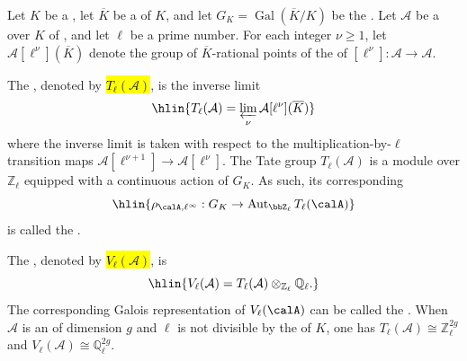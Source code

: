 \begin{definition} \label{definition:ell_adic_tate_group_of_a_commutative_group_scheme_over_a_field}
Let $K$ be a , let $\overline{K}$ be a  of $K$, and let $G_K = \operatorname{Gal}(\overline{K}/K)$ be the . Let $\mathcal{A}$ be a  over $K$ of , and let $\ell$ be a prime number. For each integer $\nu \geq 1$, let $\mathcal{A}[\ell^\nu](\overline{K})$ denote the group of $\overline{K}$-rational points of the  of $[\ell^\nu]: \mathcal{A} \to \mathcal{A}$. 

The , denoted by \hl{$T_\ell(\mathcal{A})$}, is the inverse limit
$$\hlin{T_\ell(\mathcal{A}) = \varprojlim_{\nu} \mathcal{A}[\ell^\nu](\overline{K})}$$
where the inverse limit is taken with respect to the multiplication-by-$\ell$ transition maps $\mathcal{A}[\ell^{\nu+1}] \to \mathcal{A}[\ell^\nu]$. The Tate group $T_\ell(\mathcal{A})$ is a module over $\mathbb{Z}_\ell$ equipped with a continuous action of $G_K$. As such, its corresponding  
$$\hlin{\rho_{\calA,\ell^\infty} : G_K \to \operatorname{Aut}_{\bbZ_\ell} T_\ell(\calA)}$$
is called the .

The , denoted by \hl{$V_\ell(\mathcal{A})$}, is
$$\hlin{V_\ell(\mathcal{A}) = T_\ell(\mathcal{A}) \otimes_{\mathbb{Z}_\ell} \mathbb{Q}_\ell.}$$
The corresponding Galois representation of $V_\ell(\calA)$ can be called the .
When $\mathcal{A}$ is an  of dimension $g$ and $\ell$ is not divisible by the  of $K$, one has $T_\ell(\mathcal{A}) \cong \mathbb{Z}_\ell^{2g}$ and $V_\ell(\mathcal{A}) \cong \mathbb{Q}_\ell^{2g}$.
\end{definition}
